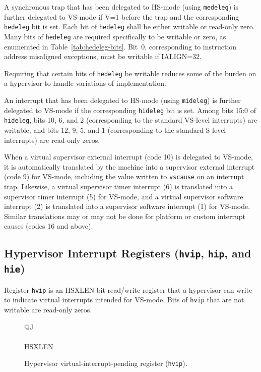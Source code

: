 A synchronous trap that has been delegated to HS-mode (using
{\tt medeleg}) is further delegated to VS-mode if V=1 before the trap and
the corresponding {\tt hedeleg} bit is set.
Each bit of {\tt hedeleg} shall be either writable or read-only zero.
Many bits of {\tt hedeleg} are required specifically to be writable or
zero, as enumerated in Table~\ref{tab:hedeleg-bits}.
Bit~0, corresponding to instruction address misaligned exceptions, must
be writable if IALIGN=32.

\begin{commentary}
Requiring that certain bits of {\tt hedeleg} be writable reduces some of
the burden on a hypervisor to handle variations of implementation.
\end{commentary}

An interrupt that has been delegated to HS-mode (using {\tt mideleg}) is
further delegated to VS-mode if the corresponding {\tt hideleg} bit is
set.
Among bits 15:0 of {\tt hideleg}, bits 10, 6, and 2 (corresponding
to the standard VS-level interrupts) are writable, and bits 12, 9, 5,
and 1 (corresponding to the standard S-level interrupts) are read-only
zeros.

When a virtual supervisor external interrupt (code 10) is delegated to
VS-mode, it is automatically translated by the machine into a supervisor
external interrupt (code 9) for VS-mode, including the value written to
{\tt vscause} on an interrupt trap.
Likewise, a virtual supervisor timer interrupt (6) is translated into a
supervisor timer interrupt (5) for VS-mode, and a virtual supervisor
software interrupt (2) is translated into a supervisor software interrupt
(1) for VS-mode.
Similar translations may or may not be done for platform or custom
interrupt causes (codes 16 and above).

\subsection{Hypervisor Interrupt Registers ({\tt hvip}, {\tt hip}, and {\tt hie})}
\label{sec:hinterruptregs}

Register {\tt hvip} is an HSXLEN-bit read/write register that a
hypervisor can write to indicate virtual interrupts intended for VS-mode.
Bits of {\tt hvip} that are not writable are read-only zeros.

\begin{figure}[h!]
{\footnotesize
\begin{center}
\begin{tabular}{@{}J}
 \\
\hline
{} \\
\hline
HSXLEN \\
\end{tabular}
\end{center}
}
\vspace{-0.1in}
\caption{Hypervisor virtual-interrupt-pending register ({\tt hvip}).}
\label{hvipreg}
\end{figure}


